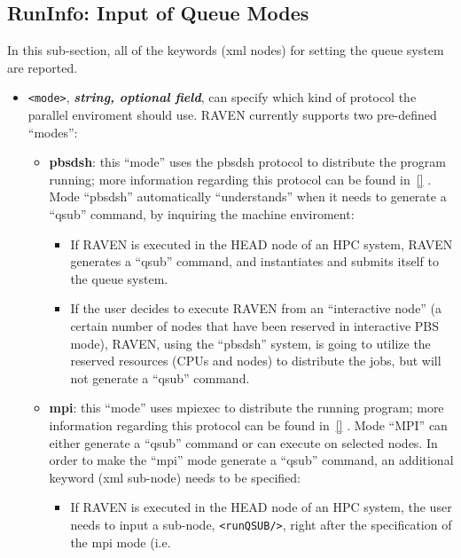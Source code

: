 \subsection{RunInfo: Input of Queue Modes}
\label{subsec:runinfoModes}
In this sub-section, all of the keywords (xml nodes) for setting the queue
system are reported.
\begin{itemize}
\item \texttt{<mode>}, \textbf{\textit{string, optional field}}, can specify
which kind of protocol the parallel enviroment should use.
%
RAVEN currently supports two pre-defined ``modes'':
  \begin{itemize}
    \item \textbf{pbsdsh}: this ``mode'' uses the pbsdsh protocol to distribute
      the program running; more information regarding this protocol can be found
      in~\ref{} .
      Mode ``pbsdsh'' automatically ``understands'' when it needs to generate
      a ``qsub'' command, by inquiring the machine enviroment:
         \begin{itemize}
           \item If RAVEN is executed in the HEAD node of an HPC system, RAVEN
             generates a ``qsub'' command, and instantiates and submits itself
             to the queue system.
           \item If the user decides to execute RAVEN from an ``interactive
             node'' (a certain number of nodes that have been reserved in
             interactive PBS mode), RAVEN, using the ``pbsdsh'' system, is going
             to utilize the reserved resources (CPUs and nodes) to distribute
             the jobs, but will not generate a ``qsub'' command.
         \end{itemize}
    \item \textbf{mpi}: this ``mode'' uses mpiexec to distribute the running
      program; more information regarding this protocol can be found in~\ref{}
      .
      Mode ``MPI''  can either generate a ``qsub'' command or can execute on
      selected nodes.
      In order to make the ``mpi'' mode generate a ``qsub'' command, an
      additional keyword (xml sub-node) needs to be specified:
         \begin{itemize}
           \item If RAVEN is executed in the HEAD node of an HPC system, the
             user needs to input a sub-node, \texttt{<runQSUB/>}, right after
             the specification of the mpi mode (i.e.\\

\end{itemize}
\end{itemize}
\end{itemize}
